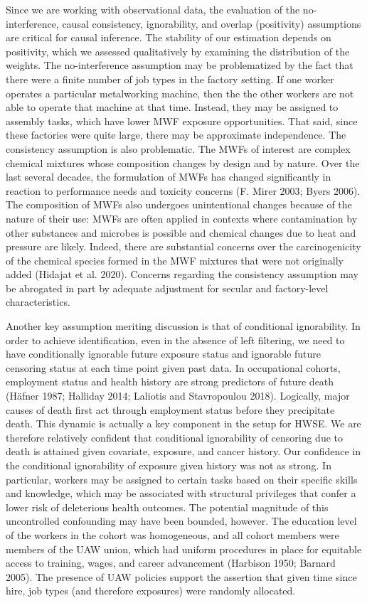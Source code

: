 \documentclass[
  11pt,
]{article}
\begin{document}
Since we are working with observational data, the evaluation of the
no-interference, causal consistency, ignorability, and overlap
(positivity) assumptions are critical for causal inference. The
stability of our estimation depends on positivity, which we assessed
qualitatively by examining the distribution of the weights. The
no-interference assumption may be problematized by the fact that there
were a finite number of job types in the factory setting. If one worker
operates a particular metalworking machine, then the the other workers
are not able to operate that machine at that time. Instead, they may be
assigned to assembly tasks, which have lower MWF exposure opportunities.
That said, since these factories were quite large, there may be
approximate independence. The consistency assumption is also
problematic. The MWFs of interest are complex chemical mixtures whose
composition changes by design and by nature. Over the last several
decades, the formulation of MWFs has changed significantly in reaction
to performance needs and toxicity concerns (F. Mirer 2003; Byers 2006).
The composition of MWFs also undergoes unintentional changes because of
the nature of their use: MWFs are often applied in contexts where
contamination by other substances and microbes is possible and chemical
changes due to heat and pressure are likely. Indeed, there are
substantial concerns over the carcinogenicity of the chemical species
formed in the MWF mixtures that were not originally added (Hidajat et
al. 2020). Concerns regarding the consistency assumption may be
abrogated in part by adequate adjustment for secular and factory-level
characteristics.

Another key assumption meriting discussion is that of conditional
ignorability. In order to achieve identification, even in the absence of
left filtering, we need to have conditionally ignorable future exposure
status and ignorable future censoring status at each time point given
past data. In occupational cohorts, employment status and health history
are strong predictors of future death (Häfner 1987; Halliday 2014;
Laliotis and Stavropoulou 2018). Logically, major causes of death first
act through employment status before they precipitate death. This
dynamic is actually a key component in the setup for HWSE. We are
therefore relatively confident that conditional ignorability of
censoring due to death is attained given covariate, exposure, and cancer
history. Our confidence in the conditional ignorability of exposure
given history was not as strong. In particular, workers may be assigned
to certain tasks based on their specific skills and knowledge, which may
be associated with structural privileges that confer a lower risk of
deleterious health outcomes. The potential magnitude of this
uncontrolled confounding may have been bounded, however. The education
level of the workers in the cohort was homogeneous, and all cohort
members were members of the UAW union, which had uniform procedures in
place for equitable access to training, wages, and career advancement
(Harbison 1950; Barnard 2005). The presence of UAW policies support the
assertion that given time since hire, job types (and therefore
exposures) were randomly allocated.
\end{document}
